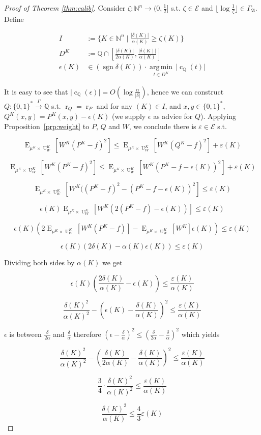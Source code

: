 \documentclass{article}
\numberwithin{equation}{section}
\theoremstyle{definition}
\theoremstyle{plain}
\newcommand{\Bool}{\{0,1\}}
\newcommand{\Words}{{\Bool^*}}
\DeclareMathOperator{\Sgn}{sgn}
\DeclareMathOperator{\E}{E}
\DeclareMathOperator{\R}{r}
\DeclareMathOperator{\Un}{U}
\DeclareMathOperator{\En}{c}
\newcommand{\Argmin}[1]{\underset{#1}{\operatorname{arg\,min}}\,}
\newcommand{\Nats}{\mathbb{N}}
\newcommand{\Rats}{\mathbb{Q}}
\newcommand{\NatFun}{\Nats^n \rightarrow}
\newcommand{\Abs}[1]{\lvert #1 \rvert}
\newcommand{\Floor}[1]{\lfloor #1 \rfloor}
\newcommand{\GrowA}{\Gamma_{\mathfrak{A}}}
\newcommand{\Fall}{\mathcal{E}}
\newcommand{\Scheme}{\xrightarrow{\Gamma}}
\begin{document}
\begin{proof}[Proof of Theorem \ref{thm:calib}]

Consider $\zeta: \NatFun (0,\frac{1}{2}]$ s.t.  $\zeta \in \Fall$ and $\Floor{\log \frac{1}{\zeta}} \in \GrowA$. Define 

\begin{align*}
I&:=\{K \in \Nats^n \mid \frac{\Abs{\delta(K)}}{\alpha(K)} \geq \zeta(K)\} \\
D^{K}&:=\Rats \cap [\frac{\Abs{\delta(K)}}{2\alpha(K)},\frac{\Abs{\delta(K)}}{\alpha(K)}] \\
\epsilon(K) &\in (\Sgn \delta(K)) \cdot \Argmin{t \in D^{K}} \Abs{\En_\Rats(t)}
\end{align*}

It is easy to see that ${\Abs{\En_\Rats(\epsilon)} = O(\log \frac{\alpha}{\Abs{\delta}})}$, hence we can construct $Q: \Words \Scheme \Rats$ s.t. $\R_Q=\R_P$ and for any $(K) \in I$, and $x,y \in \Words$, $Q^{K}(x,y)=P^{K}(x,y)-\epsilon(K)$ (we supply $\epsilon$ as advice for $Q$). Applying Proposition~\ref{prp:weight} to $P$, $Q$ and $W$, we conclude there is $\varepsilon \in \Fall$ s.t.

$$\E_{\mu^{K} \times \Un_W^{K}}[W^{K}(P^{K} - f)^2] \leq \E_{\mu^{K} \times \Un_W^{K}}[W^{K}(Q^{K}-f)^2] + \varepsilon(K)$$

$$\E_{\mu^{K} \times \Un_W^{K}}[W^{K}(P^{K} - f)^2] \leq \E_{\mu^{K} \times \Un_W^{K}}[W^{K}(P^{K}-f-\epsilon(K))^2] + \varepsilon(K)$$

$$\E_{\mu^{K} \times \Un_W^{K}}[W^{K}((P^{K} - f)^2 - (P^{K}-f-\epsilon(K))^2] \leq \varepsilon(K)$$

$$ \epsilon(K) \E_{\mu^{K} \times \Un_W^{K}}[W^{K}(2(P^{K} - f) - \epsilon(K))] \leq \varepsilon(K)$$

$$ \epsilon(K) (2 \E_{\mu^{K} \times \Un_W^{K}}[W^{K}(P^{K} - f)]-\E_{\mu^{K} \times \Un_W^{K}}[W^{K}]\epsilon(K)) \leq \varepsilon(K)$$

$$ \epsilon(K) (2 \delta(K) - \alpha(K)\epsilon(K)) \leq \varepsilon(K)$$

Dividing both sides by $ \alpha(K)$ we get

$$\epsilon(K) (\frac{2\delta(K)}{\alpha(K)} - \epsilon(K)) \leq \frac{\varepsilon(K)}{\alpha(K)}$$

$$\frac{\delta(K)^2}{\alpha(K)^2}-(\epsilon(K) - \frac{\delta(K)}{\alpha(K)})^2 \leq \frac{\varepsilon(K)}{\alpha(K)}$$

$\epsilon$ is between $\frac{\delta}{2\alpha}$ and $\frac{\delta}{\alpha}$ therefore $(\epsilon-\frac{\delta}{\alpha})^2 \leq (\frac{\delta}{2\alpha} - \frac{\delta}{\alpha})^2$  which yields

$$\frac{\delta(K)^2}{\alpha(K)^2}-(\frac{\delta(K)}{2\alpha(K)} - \frac{\delta(K)}{\alpha(K)})^2 \leq \frac{\varepsilon(K)}{\alpha(K)}$$

$$\frac{3}{4} \cdot \frac{\delta(K)^2}{\alpha(K)^2} \leq \frac{\varepsilon(K)}{\alpha(K)}$$

$$\frac{\delta(K)^2}{\alpha(K)} \leq \frac{4}{3}\varepsilon(K)$$
\end{proof}
\end{document}
